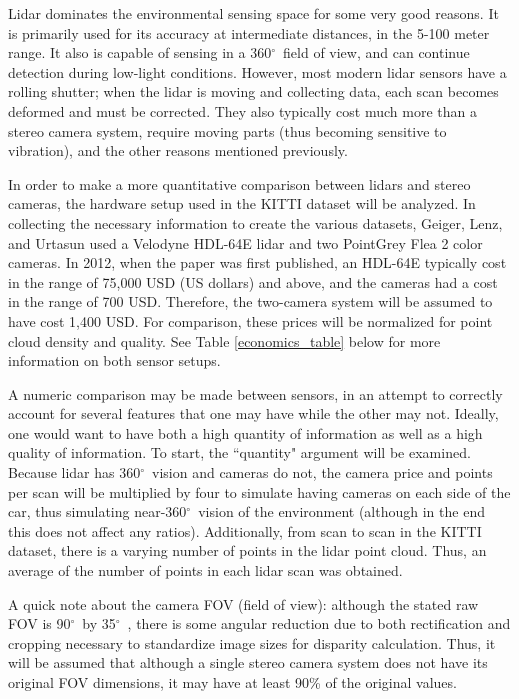 \def \deg {$ ^{\circ}$\ } %
Lidar dominates the environmental sensing space for some very good reasons. It is primarily used for its accuracy at intermediate distances, in the 5-100 meter range. It also is capable of sensing in a 360\deg field of view, and can continue detection during low-light conditions. However, most modern lidar sensors have a rolling shutter; when the lidar is moving and collecting data, each scan becomes deformed and must be corrected. They also typically cost much more than a stereo camera system, require moving parts (thus becoming sensitive to vibration), and the other reasons mentioned previously.

In order to make a more quantitative comparison between lidars and stereo cameras, the hardware setup used in the KITTI dataset will be analyzed. In collecting the necessary information to create the various datasets, Geiger, Lenz, and Urtasun \cite{geiger_are_2012} used a Velodyne HDL-64E lidar and two PointGrey Flea 2 color cameras. In 2012, when the paper was first published, an HDL-64E typically cost in the range of 75,000 USD (US dollars) and above, and the cameras had a cost in the range of 700 USD. Therefore, the two-camera system will be assumed to have cost 1,400 USD. For comparison, these prices will be normalized for point cloud density and quality. See Table \ref{economics_table} below for more information on both sensor setups.

A numeric comparison may be made between sensors, in an attempt to correctly account for several features that one may have while the other may not. Ideally, one would want to have both a high quantity of information as well as a high quality of information. To start, the ``quantity" argument will be examined. Because lidar has 360\deg vision and cameras do not, the camera price and points per scan will be multiplied by four to simulate having cameras on each side of the car, thus simulating near-360\deg vision of the environment (although in the end this does not affect any ratios). Additionally, from scan to scan in the KITTI dataset, there is a varying number of points in the lidar point cloud. Thus, an average of the number of points in each lidar scan was obtained.

A quick note about the camera FOV (field of view): although the stated raw FOV is 90\deg by 35\deg, there is some angular reduction due to both rectification and cropping necessary to standardize image sizes for disparity calculation. Thus, it will be assumed that although a single stereo camera system does not have its original FOV dimensions, it may have at least 90\% of the original values.

